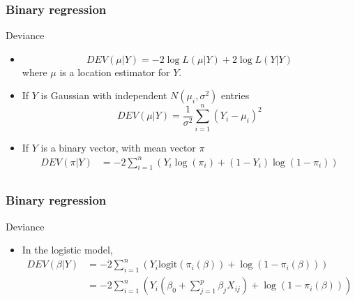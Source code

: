 \documentclass[handout]{beamer}
\newcommand{\logit}{\text{logit}}
\begin{document}

   \begin{frame} \frametitle{Binary regression}

   \begin{block}
   {Deviance}
   \begin{itemize}

   \item
   $$
   DEV(\mu| Y) = -2 \log L(\mu| Y) + 2 \log L(Y| Y)$$
   where $\mu$ is a  location estimator for $Y$.

   \item If $Y$ is Gaussian with independent $N(\mu_i,\sigma^2)$ entries
   $$
   DEV(\mu| Y) = \frac{1}{\sigma^2}\sum_{i=1}^n(Y_i - \mu_i)^2$$

   \item If $Y$ is a binary vector,  with mean vector $\pi$
   $$
   \begin{aligned}
   DEV(\pi| Y) &= -2 \sum_{i=1}^n \left( Y_i \log(\pi_i) + (1-Y_i) \log(1-\pi_i) \right) \\
   \end{aligned}
   $$
   \end{itemize}
   \end{block}
   \end{frame}


   \begin{frame} \frametitle{Binary regression}

   \begin{block}
   {Deviance}
   \begin{itemize}

   \item In the logistic model,
   $$
   \begin{aligned}
   DEV(\beta| Y) &=  -2 \sum_{i=1}^n \left( Y_i \logit(\pi_i(\beta)) + \log(1-\pi_i(\beta)) \right) \\
   &= -2 \sum_{i=1}^n \left(Y_i \left(\beta_0 + \sum_{j=1}^p \beta_j X_{ij} \right) + \log(1 - \pi_i(\beta)) \right)
   \end{aligned}
   $$
   \end{itemize}
   \end{block}
   \end{frame}

\end{document}
